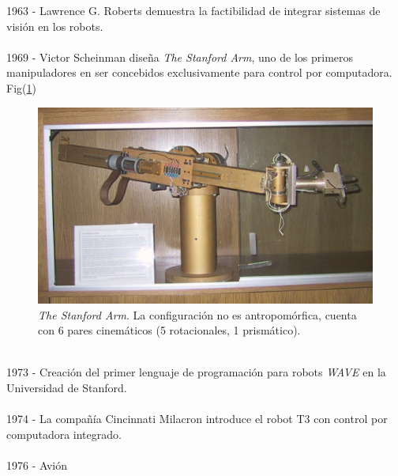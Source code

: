 1963 - Lawrence G. Roberts demuestra la factibilidad de integrar sistemas de visión en los robots.\\\\
1969 - Victor Scheinman diseña \textit{The Stanford Arm}, uno de los primeros manipuladores en ser concebidos exclusivamente para control por computadora. Fig(\ref{stfarm})\\
\begin{figure}[h!]
	\centering
	\includegraphics[scale=0.3]{Capitulo1/figs/StanfordArm.jpg} 
	\caption{\textit{The Stanford Arm}. La configuración no es antropomórfica, cuenta con 6 pares cinemáticos (5 rotacionales, 1 prismático).}
	\label{stfarm}
\end{figure}\\
1973 - Creación del primer lenguaje de programación para robots \textit{WAVE} en la Universidad de Stanford.\\\\
1974 - La compañía Cincinnati Milacron introduce el robot T3 con control por computadora integrado.\\\\
1976 - Avión\\\\
